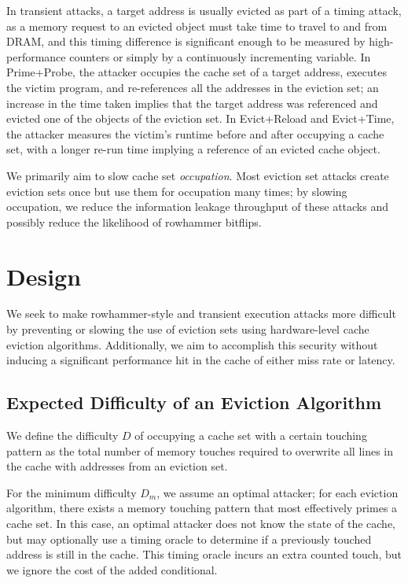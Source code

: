 \documentclass[letterpaper, twocolumn]{article}
\begin{document}
In transient attacks, a target address is usually evicted as part of a timing attack, as a memory request to an evicted object
must take time to travel to and from DRAM, and this timing difference is significant enough to be measured
by high-performance counters or simply by a continuously incrementing variable.
In Prime+Probe, the attacker occupies the cache set of a target address, executes the victim program, and re-references
all the addresses in the eviction set; an increase in the time taken implies that the target address was referenced and evicted
one of the objects of the eviction set.
In Evict+Reload and Evict+Time, the attacker measures the victim's runtime before and after occupying a cache set,
with a longer re-run time implying a reference of an evicted cache object.

We primarily aim to slow cache set \textit{occupation}.
Most eviction set attacks create eviction sets once but use them for occupation many times;
by slowing occupation, we reduce the information leakage throughput of these attacks
and possibly reduce the likelihood of rowhammer bitflips.

\section{Design}

We seek to make rowhammer-style and transient execution attacks more difficult by preventing or slowing the use of eviction sets
using hardware-level cache eviction algorithms.
Additionally, we aim to accomplish this security without inducing a significant performance hit in the cache of either miss rate or latency.

\subsection{Expected Difficulty of an Eviction Algorithm}
We define the difficulty $D$ of occupying a cache set with a certain touching pattern
as the total number of memory touches required to overwrite all lines in the cache
with addresses from an eviction set.

For the minimum difficulty $D_m$, we assume an optimal attacker;
for each eviction algorithm, there exists a memory touching pattern that
most effectively primes a cache set.
In this case, an optimal attacker does not know the state of the cache,
but may optionally use a timing oracle to determine if a previously touched address
is still in the cache.
This timing oracle incurs an extra counted touch, but we ignore the cost of
the added conditional.
\end{document}
